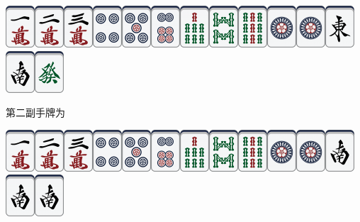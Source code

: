 \documentclass[
    lang=cn,
    color=green
]{elegantbook}
\newcommand{\problemheader}[1]{
    \chapter*{#1.\quad \ref*{pro:#1}}
    \addcontentsline{toc}{chapter}{A.\ref*{pro:#1}}
    \begin{center}
        运行时间上限：\ref*{tim:#1} \quad 运行内存上限：\ref*{mem:#1} \quad 题目类型：\ref*{typ:#1} \quad 命题人：\ref*{aut:#1}
    \end{center}
}
\newcommand{\problembody}[4]{
    \section*{题目描述}
    #1
    \section*{输入格式}
    #2
    \section*{输出格式}
    #3
    \section*{输入输出样例}
    #4
}
\newcommand{\makeproblem}[5]{
    \problemheader{#1}
    \problembody{#2}{#3}{#4}{#5}
}
\begin{document}
\begin{center}
    \includegraphics[scale=0.5]{images/mahjong/1m.png}\includegraphics[scale=0.5]{images/mahjong/2m.png}\includegraphics[scale=0.5]{images/mahjong/3m.png}\includegraphics[scale=0.5]{images/mahjong/4p.png}\includegraphics[scale=0.5]{images/mahjong/5p.png}\includegraphics[scale=0.5]{images/mahjong/6p.png}\includegraphics[scale=0.5]{images/mahjong/7s.png}\includegraphics[scale=0.5]{images/mahjong/8s.png}\includegraphics[scale=0.5]{images/mahjong/9s.png}\includegraphics[scale=0.5]{images/mahjong/1p.png}\includegraphics[scale=0.5]{images/mahjong/1p.png}\includegraphics[scale=0.5]{images/mahjong/1z.png}\includegraphics[scale=0.5]{images/mahjong/2z.png}\includegraphics[scale=0.5]{images/mahjong/6z.png}
\end{center}

第二副手牌为

\begin{center}
    \includegraphics[scale=0.5]{images/mahjong/1m.png}\includegraphics[scale=0.5]{images/mahjong/2m.png}\includegraphics[scale=0.5]{images/mahjong/3m.png}\includegraphics[scale=0.5]{images/mahjong/4p.png}\includegraphics[scale=0.5]{images/mahjong/5p.png}\includegraphics[scale=0.5]{images/mahjong/6p.png}\includegraphics[scale=0.5]{images/mahjong/7s.png}\includegraphics[scale=0.5]{images/mahjong/8s.png}\includegraphics[scale=0.5]{images/mahjong/9s.png}\includegraphics[scale=0.5]{images/mahjong/1p.png}\includegraphics[scale=0.5]{images/mahjong/1p.png}\includegraphics[scale=0.5]{images/mahjong/2z.png}\includegraphics[scale=0.5]{images/mahjong/2z.png}\includegraphics[scale=0.5]{images/mahjong/2z.png}
\end{center}
\clearpage

\end{document}

